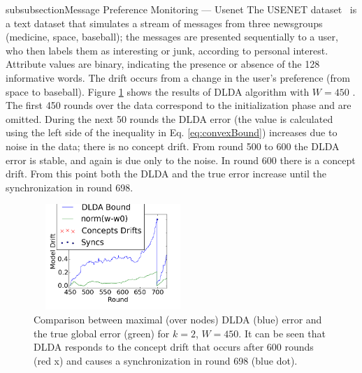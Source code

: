 \documentclass{sig-alternate-05-2015}
\begin{document}
subsubsection{Message Preference Monitoring --- Usenet}
The USENET dataset~\cite{usenet} is a text dataset that simulates a stream of messages from three newsgroups (medicine, space, baseball); the messages are presented sequentially to a user, who then labels them as interesting or junk, according to personal interest. Attribute values are binary, indicating the presence or absence of the 128 informative words. The drift occurs from a change in the user's
preference (from space to baseball). Figure \ref{usenet} shows the results of
DLDA algorithm with $W=450$ . The first 450 rounds over the data correspond to 
the initialization phase and are omitted. During the next 50 rounds the DLDA error
(the value is calculated using the left side of the inequality in Eq.
\ref{eq:convexBound}) increases due to noise in the data; there is
no concept drift. From round 500 to 600 the DLDA error is stable,
and again is due only to the noise. In round 600 there is a concept
drift.
From this point both the DLDA and the true error increase until the
synchronization in round 698.

\begin{figure}[h]
	\centering
	\includegraphics[width=60mm, height=4cm]{Usenet/DriftDetected.png}
	\caption{Comparison between maximal (over nodes) DLDA (blue)
	error and the true global error (green) for $k=2$, $W=450$.
	It can be seen that DLDA responds to the concept drift that occurs
	after 600 rounds (red x) and causes a synchronization in round 698 (blue dot).}
	\label{usenet}
	\end{figure}
	
\end{document}
